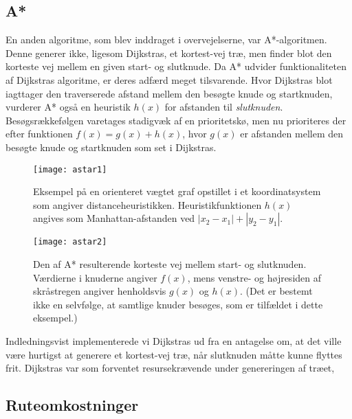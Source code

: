\subsection{A*}
\label{subsec:astar}
En anden algoritme, som blev inddraget i overvejelserne, var A*-algoritmen. Denne generer ikke, ligesom Dijkstras, et kortest-vej træ, men finder blot den korteste vej mellem en given start- og slutknude. Da A* udvider funktionaliteten af Dijkstras algoritme, er deres adfærd meget tilsvarende. Hvor Dijkstras blot iagttager den traverserede afstand mellem den besøgte knude og startknuden, vurderer A* også en heuristik $h(x)$ for afstanden til \emph{slutknuden}. Besøgsrækkefølgen varetages stadigvæk af en prioritetskø, men nu prioriteres der efter funktionen $f(x)=g(x)+h(x)$, hvor $g(x)$ er afstanden mellem den besøgte knude og startknuden som set i Dijkstras.

\begin{figure}[ht]
	\centering
  \texttt{[image: astar1]}
  \captionsetup{width=0.8\textwidth}
	\caption{Eksempel på en orienteret vægtet graf opstillet i et koordinatsystem som angiver distanceheuristikken. Heuristikfunktionen $h(x)$ angives som Manhattan-afstanden ved $|x_2-x_1|+|y_2-y_1|$.}
  \label{fig:astar1}
\end{figure}

\begin{figure}[ht]
	\centering
  \texttt{[image: astar2]}
  \captionsetup{width=0.8\textwidth}
	\caption{Den af A* resulterende korteste vej mellem start- og slutknuden. Værdierne i knuderne angiver $f(x)$, mens venstre- og højresiden af skråstregen angiver henholdsvis $g(x)$ og $h(x)$. (Det er bestemt ikke en selvfølge, at samtlige knuder besøges, som er tilfældet i dette eksempel.)}
  \label{fig:astar2}
\end{figure}

Indledningsvist implementerede vi Dijkstras ud fra en antagelse om, at det ville være hurtigst at generere et kortest-vej træ, når slutknuden måtte kunne flyttes frit. Dijkstras var som forventet resursekrævende under genereringen af træet, %

\subsection{Ruteomkostninger}
\label{subsec:ruteomkostninger}
